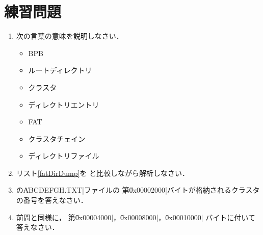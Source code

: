 \section*{練習問題}
\begin{enumerate}
\item 次の言葉の意味を説明しなさい．
  \begin{itemize}
  \item BPB
  \item ルートディレクトリ
  \item クラスタ
  \item ディレクトリエントリ
  \item FAT
  \item クラスタチェイン
  \item ディレクトリファイル
  \end{itemize}

\item リスト\ref{fatDirDump}を
  と比較しながら解析しなさい．

\item {}の\|ABCDEFGH.TXT|ファイルの
  第\|0x00002000|バイトが格納されるクラスタの番号を答えなさい．

\item 前問と同様に，
  第\|0x00004000|，\|0x00008000|，\|0x00010000|
  バイトに付いて答えなさい．
\end{enumerate}
